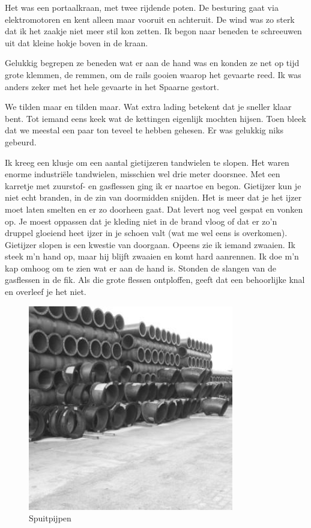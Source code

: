 \documentclass[12pt,twoside, openright]{memoir}
\begin{document}
Het was een portaalkraan, met twee rijdende poten. De besturing gaat via elektromotoren en kent alleen maar vooruit en achteruit. De wind was zo sterk dat ik het zaakje niet meer stil kon zetten. Ik begon naar beneden te schreeuwen uit dat kleine hokje boven in de kraan. 

Gelukkig begrepen ze beneden wat er aan de hand was en konden ze net op tijd grote klemmen, de remmen, om de rails gooien waarop het gevaarte reed. Ik was anders zeker met het hele gevaarte in het Spaarne gestort.

We tilden maar en tilden maar. Wat extra lading betekent dat je sneller klaar bent. Tot iemand eens keek wat de kettingen eigenlijk mochten hijsen. Toen bleek dat we meestal een paar ton teveel te hebben gehesen. Er was gelukkig niks gebeurd.

Ik kreeg een klusje om een aantal gietijzeren tandwielen te slopen. Het waren enorme industriële tandwielen, misschien wel drie meter doorsnee. Met een karretje met zuurstof- en gasflessen ging ik er naartoe en begon. Gietijzer kun je niet echt branden, in de zin van doormidden snijden. Het is meer dat je het ijzer moet laten smelten en er zo doorheen gaat. Dat levert nog veel gespat en vonken op. Je moest oppassen dat je kleding niet in de brand vloog of dat er zo’n druppel gloeiend heet ijzer in je schoen valt (wat me wel eens is overkomen). Gietijzer slopen is een kwestie van doorgaan. Opeens zie ik iemand zwaaien. Ik steek m’n hand op, maar hij blijft zwaaien en komt hard aanrennen. Ik doe m’n kap omhoog om te zien wat er aan de hand is. Stonden de slangen van de gasflessen in de fik. Als die grote flessen ontploffen, geeft dat een behoorlijke knal en overleef je het niet. 

\begin{figure}
\centering
\includegraphics[width=0.8\textwidth]{img/224spuitpijpen}
\caption*{\footnotesize Spuitpijpen}
\end{figure}
\end{document}
